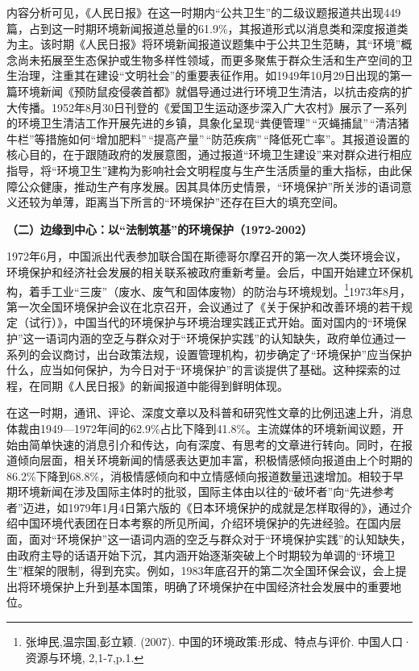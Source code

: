 内容分析可见，《人民日报》在这一时期内``公共卫生''的二级议题报道共出现449篇，占到这一时期环境新闻报道总量的61.9\%，其报道形式以消息类和深度报道类为主。该时期《人民日报》将环境新闻报道议题集中于公共卫生范畴，其``环境''概念尚未拓展至生态保护或生物多样性领域，而更多聚焦于群众生活和生产空间的卫生治理，注重其在建设``文明社会''的重要表征作用。如1949年10月29日出现的第一篇环境新闻《预防鼠疫侵袭首都》就倡导通过进行环境卫生清洁，以抗击疫病的扩大传播。1952年8月30日刊登的《爱国卫生运动逐步深入广大农村》展示了一系列的环境卫生清洁工作开展先进的乡镇，具象化呈现``粪便管理''\,``灭蝇捕鼠''\,``清洁猪牛栏''等措施如何``增加肥料''\,``提高产量''\,``防范疾病''\,``降低死亡率''。其报道设置的核心目的，在于跟随政府的发展意图，通过报道``环境卫生建设''来对群众进行相应指导，将``环境卫生''建构为影响社会文明程度与生产生活质量的重大指标，由此保障公众健康，推动生产有序发展。因其具体历史情景，``环境保护''所关涉的语词意义还较为单薄，距离当下所言的``环境保护''还存在巨大的填充空间。

\textbf{（二）边缘到中心：以``法制筑基''的环境保护（1972-2002）}

1972年6月，中国派出代表参加联合国在斯德哥尔摩召开的第一次人类环境会议，环境保护和经济社会发展的相关联系被政府重新考量。会后，中国开始建立环保机构，着手工业``三废''（废水、废气和固体废物）的防治与环境规划。\footnote{张坤民,温宗国,彭立颖.
  (2007). 中国的环境政策:形成、特点与评价. 中国人口·资源与环境,
  2,1-7,p.1.}1973年8月，第一次全国环境保护会议在北京召开，会议通过了《关于保护和改善环境的若干规定（试行）》，中国当代的环境保护与环境治理实践正式开始。面对国内的``环境保护''这一语词内涵的空乏与群众对于``环境保护实践''的认知缺失，政府单位通过一系列的会议商讨，出台政策法规，设置管理机构，初步确定了``环境保护''应当保护什么，应当如何保护，为今日对于``环境保护''的言谈提供了基础。这种探索的过程，在同期《人民日报》的新闻报道中能得到鲜明体现。

在这一时期，通讯、评论、深度文章以及科普和研究性文章的比例迅速上升，消息体裁由1949---1972年间的62.9\%占比下降到41.8\%。主流媒体的环境新闻议题，开始由简单快速的消息引介和传达，向有深度、有思考的文章进行转向。同时，在报道倾向层面，相关环境新闻的情感表达更加丰富，积极情感倾向报道由上个时期的86.2\%下降到68.8\%，消极情感倾向和中立情感倾向报道数量迅速增加。相较于早期环境新闻在涉及国际主体时的批驳，国际主体由以往的``破坏者''向``先进参考者''迈进，如1979年1月4日第六版的《日本环境保护的成就是怎样取得的》，通过介绍中国环境代表团在日本考察的所见所闻，介绍环境保护的先进经验。在国内层面，面对``环境保护''这一语词内涵的空乏与群众对于``环境保护实践''的认知缺失，由政府主导的话语开始下沉，其内涵开始逐渐突破上个时期较为单调的``环境卫生''框架的限制，得到充实。例如，1983年底召开的第二次全国环保会议，会上提出将环境保护上升到基本国策，明确了环境保护在中国经济社会发展中的重要地位。

